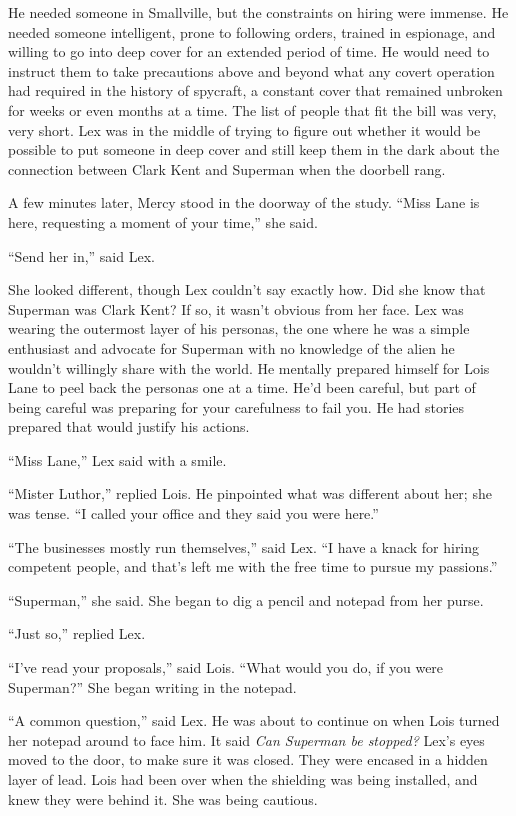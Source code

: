 \documentclass[ebook,12pt]{memoir}
\begin{document}
He needed someone in Smallville, but the constraints on hiring were
immense. He needed someone intelligent, prone to following orders,
trained in espionage, and willing to go into deep cover for an extended
period of time. He would need to instruct them to take precautions above
and beyond what any covert operation had required in the history of
spycraft, a constant cover that remained unbroken for weeks or even
months at a time. The list of people that fit the bill was very, very
short. Lex was in the middle of trying to figure out whether it would be
possible to put someone in deep cover and still keep them in the dark
about the connection between Clark Kent and Superman when the doorbell
rang.

A few minutes later, Mercy stood in the doorway of the study. ``Miss
Lane is here, requesting a moment of your time,'' she said.

``Send her in,'' said Lex.

She looked different, though Lex couldn't say exactly how. Did she know
that Superman was Clark Kent? If so, it wasn't obvious from her face.
Lex was wearing the outermost layer of his personas, the one where he
was a simple enthusiast and advocate for Superman with no knowledge of
the alien he wouldn't willingly share with the world. He mentally
prepared himself for Lois Lane to peel back the personas one at a time.
He'd been careful, but part of being careful was preparing for your
carefulness to fail you. He had stories prepared that would justify his
actions.

``Miss Lane,'' Lex said with a smile.

``Mister Luthor,'' replied Lois. He pinpointed what was different about
her; she was tense. ``I called your office and they said you were
here.''

``The businesses mostly run themselves,'' said Lex. ``I have a knack for
hiring competent people, and that's left me with the free time to pursue
my passions.''

``Superman,'' she said. She began to dig a pencil and notepad from her
purse.

``Just so,'' replied Lex.

``I've read your proposals,'' said Lois. ``What would you do, if you
were Superman?'' She began writing in the notepad.

``A common question,'' said Lex. He was about to continue on when Lois
turned her notepad around to face him. It said \emph{Can Superman be
stopped?} Lex's eyes moved to the door, to make sure it was closed. They
were encased in a hidden layer of lead. Lois had been over when the
shielding was being installed, and knew they were behind it. She was
being cautious.
\end{document}
